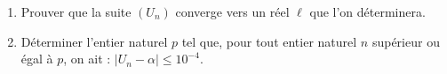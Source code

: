 \begin{description}
\begin{enumerate}
\begin{enumerate}
                                          finis, que pour tout $n \in \mathbb{N}$, on a :
                                          $
                                                |U_{n+1} - \alpha | \leq \frac{2}{3} |U_n - \alpha |
                                          $ et que 
                                          $
                                                |U_n - \alpha| \leq \left( \frac{2}{3} \right)^n \;.
                                          $
                                    \item Prouver que la suite $(U_n)$ converge vers un r\'eel $\ell$ que l'on d\'eterminera.
                                    \item D\'eterminer l'entier naturel $p$ tel que, pour tout entier naturel $n$
                                          sup\'erieur ou \'egal \`a $p$, on ait :
                                          $| U_n - \alpha | \leq 10^{-4}$.
                              \end{enumerate}
                  \end{enumerate}
      \end{description}

































